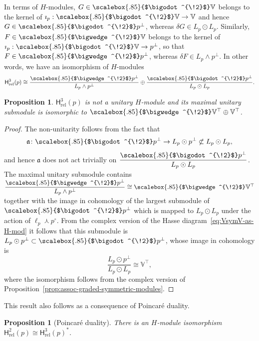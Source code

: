\documentclass[11pt,reqno,a4paper,final]{amsart}
\newcommand\ext[1]{\scalebox{.85}{$\bigwedge^{\!#1}$}}
\newcommand\sym[1]{\scalebox{.85}{$\bigodot^{\!#1}$}}
\theoremstyle{plain}
\newtheorem{proposition}[lemma]{Proposition}
\theoremstyle{definition}
\newcommand{\fa}{\mathfrak{a}}
\newcommand{\Hrel}{\mathsf{H}_{\mathrm{rel}}}
\newcommand{\VV}{\mathbb{V}}
\newcommand{\1}{\mathbb{1}}
\numberwithin{equation}{section}
\begin{document}
In terms of $H$-modules, $G \in \sym{2}\VV$ belongs to the kernel
of $\imath_p : \sym{2}\VV \to \VV$ and hence $G \in \sym{2} p^\perp$,
whereas $\delta G \in L_p \odot L_p$.  Similarly, $F \in \ext{2}\VV$ belongs to
the kernel of $\imath_p : \sym{2} \VV \to p^\perp$, so that $F \in
\ext{2}p^\perp$, whereas $\delta F \in L_p \wedge p^\perp$.  In other
words, we have an isomorphism of $H$-modules
\begin{equation}
  \label{eq:hrel3-as-h-mod-v1}
  \Hrel^3(p) \cong \dfrac{\ext{2}p^\perp}{L_p \wedge p^\perp}\oplus
\dfrac{\sym{2}p^\perp}{L_p \odot L_p}.
\end{equation}

\begin{proposition} \label{prop:Hrel3_not_unitary}
  $\Hrel^3(p)$ is not a unitary $H$-module and its maximal
  unitary submodule is isomorphic to $\ext{2}\VV^\top \oplus \VV^\top$.
\end{proposition}

\begin{proof}
  The non-unitarity follows from the fact that
  \begin{equation}
    \fa\colon \sym{2}p^\perp \to L_p \odot p^\perp \not\subset L_p \odot L_p,
  \end{equation}
  and hence $\fa$ does not act trivially on
  $\dfrac{\sym{2}p^\perp}{L_p \odot L_p}$.  The maximal unitary
  submodule contains $\dfrac{\ext{2}p^\perp}{L_p \wedge p^\perp} \cong
  \ext{2} \VV^\top$ together with the image in
  cohomology of the largest submodule of $\sym{2}p^\perp$ which is
  mapped to $L_p \odot L_p$ under the action of $\ell_p \curlywedge
  p^\circ$.  From the complex version of the Hasse
  diagram~\eqref{eq:VsymV-as-H-mod} it follows that this submodule is $L_p \odot p^\perp
  \subset \sym{2}p^\perp$, whose image in cohomology is
  \begin{equation}
    \dfrac{L_p \odot p^\perp}{L_p \odot L_p} \cong \VV^\top,
  \end{equation}
  where the isomorphism follows from the complex version of
  Proposition~\ref{prop:assoc-graded-symmetric-modules}.
\end{proof}

This result also follows as a consequence of Poincaré duality.

\begin{proposition}[Poincaré duality]
  \label{prop:poincare-duality}
  There is an $H$-module isomorphism $\Hrel^2(p) \cong \Hrel^3(p)^*$.
\end{proposition}
\end{document}
